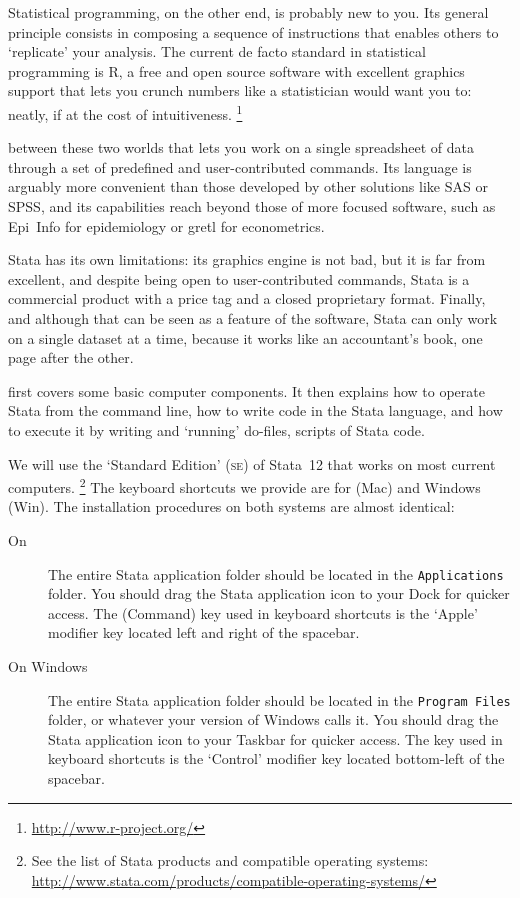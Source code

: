 Statistical programming, on the other end, is probably new to you. Its general principle consists in composing a sequence of instructions that enables others to `replicate' your analysis. The current de facto standard in statistical programming is R, a free and open source software with excellent graphics support that lets you crunch numbers like a statistician would want you to: neatly, if at the cost of intuitiveness.%
  \footnote{\url{http://www.r-project.org/}} %

 between these two worlds that lets you work on a single spreadsheet of data through a set of predefined and user-contributed commands. Its language is arguably more convenient than those developed by other solutions like SAS or SPSS, and its capabilities reach beyond those of more focused software, such as Epi~Info for epidemiology or gretl for econometrics.%

Stata has its own limitations: its graphics engine is not bad, but it is far from excellent, and despite being open to user-contributed commands, Stata is a commercial product with a price tag and a closed proprietary format. Finally, and although that can be seen as a feature of the software, Stata can only work on a single dataset at a time, because it works like an accountant's book, one page after the other.%

 first covers some basic computer components. It then explains how to operate Stata from the command line, how to write code in the Stata language, and how to execute it by writing and `running' do-files, scripts of Stata code.%

We will use the `Standard Edition' (\textsc{se}) of Stata~12 that works on most current computers.%
\footnote{See the list of Stata products and compatible operating systems: %
  \url{http://www.stata.com/products/compatible-operating-systems/}}%
  The keyboard shortcuts we provide are for \OSX (Mac) and Windows (Win). The installation procedures on both systems are almost identical:%

\begin{description}

  \item[On \OSX] %
  The entire Stata application folder should be located in the \texttt{Applications} folder. You should drag the Stata application icon to your Dock for quicker access. The  (Command) key used in keyboard shortcuts is the `Apple' modifier key located left and right of the spacebar.%

  \item[On Windows] %
  The entire Stata application folder should be located in the \texttt{Program Files} folder, or whatever your version of Windows calls it. You should drag the Stata application icon to your Taskbar for quicker access. The  key used in keyboard shortcuts is the `Control' modifier key located bottom-left of the spacebar.%

\end{description}

